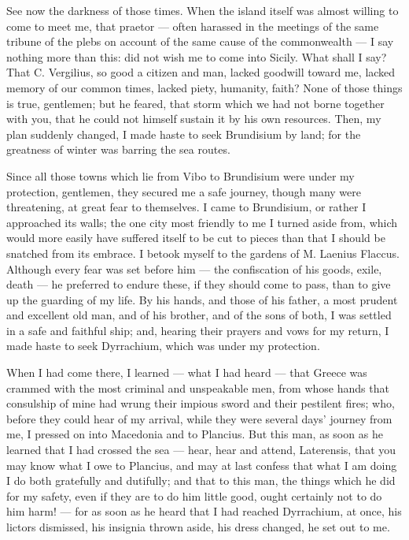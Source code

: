  See now the darkness of those times. When the island itself was almost willing to come to meet me, that praetor --- often harassed in the meetings of the same tribune of the plebs on account of the same cause of the commonwealth --- I say nothing more than this: did not wish me to come into Sicily. What shall I say? That C. Vergilius, so good a citizen and man, lacked goodwill toward me, lacked memory of our common times, lacked piety, humanity, faith? None of those things is true, gentlemen; but he feared, that storm which we had not borne together with you, that he could not himself sustain it by his own resources. Then, my plan suddenly changed, I made haste to seek Brundisium by land; for the greatness of winter was barring the sea routes.

 Since all those towns which lie from Vibo to Brundisium were under my protection, gentlemen, they secured me a safe journey, though many were threatening, at great fear to themselves. I came to Brundisium, or rather I approached its walls; the one city most friendly to me I turned aside from, which would more easily have suffered itself to be cut to pieces than that I should be snatched from its embrace. I betook myself to the gardens of M. Laenius Flaccus. Although every fear was set before him --- the confiscation of his goods, exile, death --- he preferred to endure these, if they should come to pass, than to give up the guarding of my life. By his hands, and those of his father, a most prudent and excellent old man, and of his brother, and of the sons of both, I was settled in a safe and faithful ship; and, hearing their prayers and vows for my return, I made haste to seek Dyrrachium, which was under my protection.

 When I had come there, I learned --- what I had heard --- that Greece was crammed with the most criminal and unspeakable men, from whose hands that consulship of mine had wrung their impious sword and their pestilent fires; who, before they could hear of my arrival, while they were several days' journey from me, I pressed on into Macedonia and to Plancius. But this man, as soon as he learned that I had crossed the sea --- hear, hear and attend, Laterensis, that you may know what I owe to Plancius, and may at last confess that what I am doing I do both gratefully and dutifully; and that to this man, the things which he did for my safety, even if they are to do him little good, ought certainly not to do him harm! --- for as soon as he heard that I had reached Dyrrachium, at once, his lictors dismissed, his insignia thrown aside, his dress changed, he set out to me.

